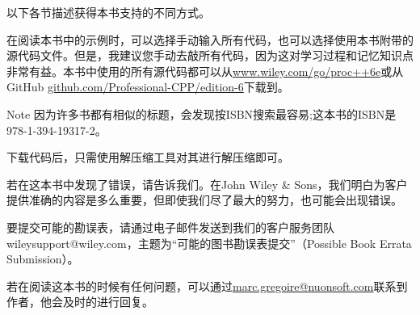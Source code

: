 
以下各节描述获得本书支持的不同方式。


在阅读本书中的示例时，可以选择手动输入所有代码，也可以选择使用本书附带的源代码文件。但是，我建议您手动去敲所有代码，因为这对学习过程和记忆知识点非常有益。本书中使用的所有源代码都可以从\url{www.wiley.com/go/proc++6e}或从GitHub \url{github.com/Professional-CPP/edition-6}下载到。

\begin{myNotic}{Note}
因为许多书都有相似的标题，会发现按ISBN搜索最容易;这本书的ISBN是978-1-394-19317-2。
\end{myNotic}

下载代码后，只需使用解压缩工具对其进行解压缩即可。


若在这本书中发现了错误，请告诉我们。在John Wiley \& Sons，我们明白为客户提供准确的内容是多么重要，但即使我们尽了最大的努力，也可能会出现错误。

要提交可能的勘误表，请通过电子邮件发送到我们的客户服务团队wileysupport@wiley.com，主题为“可能的图书勘误表提交”（Possible Book Errata Submission）。


若在阅读这本书的时候有任何问题，可以通过\url{marc.gregoire@nuonsoft.com}联系到作者，他会及时的进行回复。